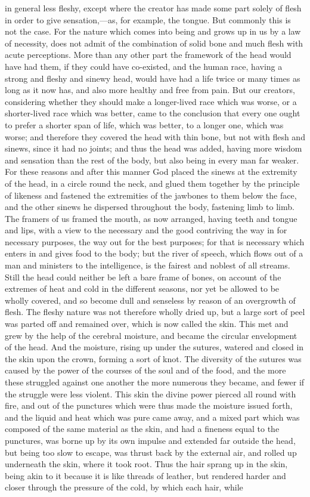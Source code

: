 \documentclass[11pt,letter]{article}
\begin{document}
in general less fleshy, except where the creator has made some part solely of flesh in order to give sensation,—as, for example, the tongue. But commonly this is not the case. For the nature which comes into being and grows up in us by a law of necessity, does not admit of the combination of solid bone and much flesh with acute perceptions. More than any other part the framework of the head would have had them, if they could have co-existed, and the human race, having a strong and fleshy and sinewy head, would have had a life twice or many times as long as it now has, and also more healthy and free from pain. But our creators, considering whether they should make a longer-lived race which was worse, or a shorter-lived race which was better, came to the conclusion that every one ought to prefer a shorter span of life, which was better, to a longer one, which was worse; and therefore they covered the head with thin bone, but not with flesh and sinews, since it had no joints; and thus the head was added, having more wisdom and sensation than the rest of the body, but also being in every man far weaker. For these reasons and after this manner God placed the sinews at the extremity of the head, in a circle round the neck, and glued them together by the principle of likeness and fastened the extremities of the jawbones to them below the face, and the other sinews he dispersed throughout the body, fastening limb to limb. The framers of us framed the mouth, as now arranged, having teeth and tongue and lips, with a view to the necessary and the good contriving the way in for necessary purposes, the way out for the best purposes; for that is necessary which enters in and gives food to the body; but the river of speech, which flows out of a man and ministers to the intelligence, is the fairest and noblest of all streams. Still the head could neither be left a bare frame of bones, on account of the extremes of heat and cold in the different seasons, nor yet be allowed to be wholly covered, and so become dull and senseless by reason of an overgrowth of flesh. The fleshy nature was not therefore wholly dried up, but a large sort of peel was parted off and remained over, which is now called the skin. This met and grew by the help of the cerebral moisture, and became the circular envelopment of the head. And the moisture, rising up under the sutures, watered and closed in the skin upon the crown, forming a sort of knot. The diversity of the sutures was caused by the power of the courses of the soul and of the food, and the more these struggled against one another the more numerous they became, and fewer if the struggle were less violent. This skin the divine power pierced all round with fire, and out of the punctures which were thus made the moisture issued forth, and the liquid and heat which was pure came away, and a mixed part which was composed of the same material as the skin, and had a fineness equal to the punctures, was borne up by its own impulse and extended far outside the head, but being too slow to escape, was thrust back by the external air, and rolled up underneath the skin, where it took root. Thus the hair sprang up in the skin, being akin to it because it is like threads of leather, but rendered harder and closer through the pressure of the cold, by which each hair, while 
\end{document}
